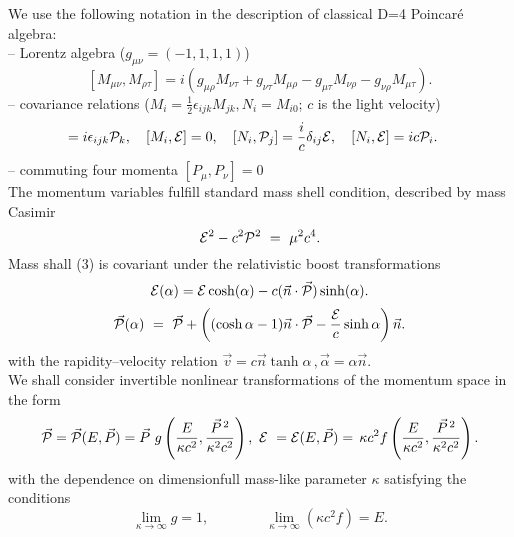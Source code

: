 \documentclass[a4paper,12pt]{article} \usepackage{times}
\begin{document}
We use the following notation in the description of classical D=4
Poincar\'{e} algebra:\\-- Lorentz algebra
($g_{\mu\nu}=(-1,1,1,1)$)
\begin{equation}\label{pary2}
[M_{\mu\nu},M_{\rho\tau}] = i(g_{\mu\rho}M_{\nu\tau}+
g_{\nu\tau}M_{\mu\rho}-g_{\mu\tau}M_{\nu\rho}
-g_{\nu\rho}M_{\mu\tau}).
\end{equation}
-- covariance relations  ($M_i= \frac12\epsilon_{ijk} M_{jk},
N_i=M_{i0}$; $c$ is the light velocity)
\begin{eqnarray}
[M_i, {\cal{P}}_j] =  i\epsilon_{ijk}{\cal{P}}_k ,\quad [M_i,
{\cal{E}} ] = 0 , \quad [N_i,{\cal{P}}_j]& =  {i\over
c}\delta_{ij}{\cal{E}} , \quad [N_i, {\cal{E}}] =  i c {\cal{P}}_i
. \label{pary3}
\end{eqnarray}
-- commuting four momenta $[P_\mu, P_\nu]=0$\\The momentum
variables fulfill standard mass shell condition, described by mass
 Casimir
\begin{equation}
\label{pary4}
{\cal{E}}^2 - c^2 {\cal{P}}^2 \ = \ \mu^2 c^4 .
\end{equation}
Mass shall (3) is covariant under the
 relativistic boost transformations
\begin{equation}
\label{pary5} {\cal{E}}(\alpha) = {\cal{E}}\cosh(\alpha)
-c(\vec{n}\cdot\vec{\cal{P}})\sinh(\alpha)
.\end{equation}\begin{equation} \vec{\cal{P}}(\alpha) \ = \
\vec{\cal{P}} + \left((\cosh\alpha-1)\vec{n}\cdot\vec{\cal{P}} -
\frac{\cal{E}}{c}\sinh\alpha\right)\vec{n} .\end{equation} with
the rapidity--velocity relation $\vec{v} = c \vec{n} \tanh
\alpha\, ,\vec{\alpha}=\alpha\vec{n}$.\\ We shall consider invertible
nonlinear transformations of the momentum space in the form
\begin{equation}\label{pary6} \vec{\cal{P}}  = \vec{\cal{P}}(E,\vec{P}) 
=
 \vec{P} \ g \left(\frac{E}{\kappa c^2} ,
\frac{\vec{P}^{\,2}}{\kappa^2 c^2}\right)  , \ {\cal{E}} \ = {\cal
E}(E,\vec{P})=  \, \kappa c^2 f\left(\frac{E}{\kappa c^2} ,
\frac{\vec{P}^{\,2}}{\kappa^2 c^2}\right).
\end{equation}
with
  the dependence on
 dimensionfull mass-like parameter $\kappa$
satisfying the conditions
\begin{equation}
\lim_{\kappa\to\infty} g =  1 ,\qquad\qquad \lim_{\kappa\to\infty}
(\kappa c^2 f)  =  E .
\end{equation}
\end{document}

